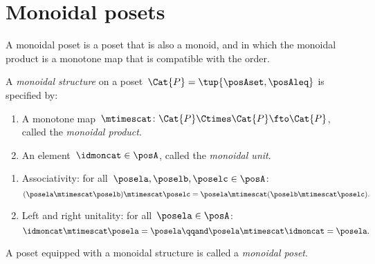 
\section{Monoidal posets}
\label{sec:monoidal-posets}

A monoidal poset is a poset that is also a monoid, and in which the monoidal product is a monotone map that is compatible with the order.


\begin{ctdefinition}
    \label{def:monoidal-poset}
    A \emph{monoidal structure} on a poset~$\Cat{P} = \tup{\posAset, \posAleq}$ is specified by:

    \constit
    \begin{enumerate}
        \item A monotone map~$\mtimescat \colon \Cat{P} \Ctimes \Cat{P} \fto \Cat{P}$, called the \emph{monoidal product}.
        \item An element~$\idmoncat \in \posA$, called the \emph{monoidal unit}.
    \end{enumerate}

    \condit
    \begin{enumerate}
        \item Associativity: for all~$\posela, \poselb, \poselc \in \posA$:
              \begin{equation}
                  (\posela \mtimescat \poselb)
                  \mtimescat \poselc =  \posela  \mtimescat ( \poselb \mtimescat \poselc).
              \end{equation}
        \item Left and right unitality: for all~$\posela \in \posA$:
              \begin{equation}
                  \idmoncat \mtimescat \posela = \posela
                  \qqand
                  \posela \mtimescat \idmoncat = \posela.
              \end{equation}
    \end{enumerate}

    \noindent A poset equipped with a monoidal structure is called a \emph{monoidal poset}.
\end{ctdefinition}

